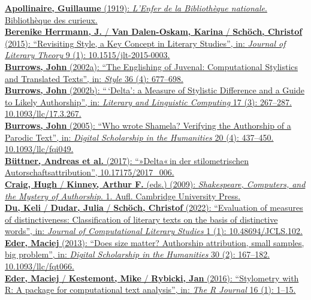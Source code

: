 \documentclass[
  letterpaper,
  DIV=11,
  numbers=noendperiod]{scrreprt}
\begin{document}
\href{https://www.zotero.org/google-docs/?4xA93b}{\textbf{Apollinaire,
Guillaume} (1919): \emph{L'Enfer de la Bibliothèque nationale}.
Bibliothèque des curieux.}\\
\href{https://www.zotero.org/google-docs/?4xA93b}{\textbf{Berenike
Herrmann, J.} / \textbf{Van Dalen-Oskam, Karina} / \textbf{Schöch,
Christof} (2015): ``Revisiting Style, a Key Concept in Literary
Studies'', in: \emph{Journal of Literary Theory} 9 (1):
10.1515/jlt-2015-0003.}\\
\href{https://www.zotero.org/google-docs/?4xA93b}{\textbf{Burrows, John}
(2002a): ``The Englishing of Juvenal: Computational Stylistics and
Translated Texts'', in: \emph{Style} 36 (4): 677--698.}\\
\href{https://www.zotero.org/google-docs/?4xA93b}{\textbf{Burrows, John}
(2002b): ``\,`Delta': a Measure of Stylistic Difference and a Guide to
Likely Authorship'', in: \emph{Literary and Linguistic Computing} 17
(3): 267--287. 10.1093/llc/17.3.267.}\\
\href{https://www.zotero.org/google-docs/?4xA93b}{\textbf{Burrows, John}
(2005): ``Who wrote Shamela? Verifying the Authorship of a Parodic
Text'', in: \emph{Digital Scholarship in the Humanities} 20 (4):
437--450. 10.1093/llc/fqi049.}\\
\href{https://www.zotero.org/google-docs/?4xA93b}{\textbf{Büttner,
Andreas et al.} (2017): ``»Delta«\,in der stilometrischen
Autorschaftsattribution'', 10.17175/2017\_006.}\\
\href{https://www.zotero.org/google-docs/?4xA93b}{\textbf{Craig, Hugh} /
\textbf{Kinney, Arthur F.} (eds.) (2009): \emph{Shakespeare, Computers,
and the Mystery of Authorship}. 1. Aufl. Cambridge University Press.}\\
\href{https://www.zotero.org/google-docs/?4xA93b}{\textbf{Du, Keli} /
\textbf{Dudar, Julia} / \textbf{Schöch, Christof} (2022): ``Evaluation
of measures of distinctiveness: Classification of literary texts on the
basis of distinctive words'', in: \emph{Journal of Computational
Literary Studies} 1 (1): 10.48694/JCLS.102.}\\
\href{https://www.zotero.org/google-docs/?4xA93b}{\textbf{Eder, Maciej}
(2013): ``Does size matter? Authorship attribution, small samples, big
problem'', in: \emph{Digital Scholarship in the Humanities} 30 (2):
167--182. 10.1093/llc/fqt066.}\\
\href{https://www.zotero.org/google-docs/?4xA93b}{\textbf{Eder, Maciej}
/ \textbf{Kestemont, Mike} / \textbf{Rybicki, Jan} (2016): ``Stylometry
with R: A package for computational text analysis'', in: \emph{The R
Journal} 16 (1): 1--15.}\\
\end{document}
